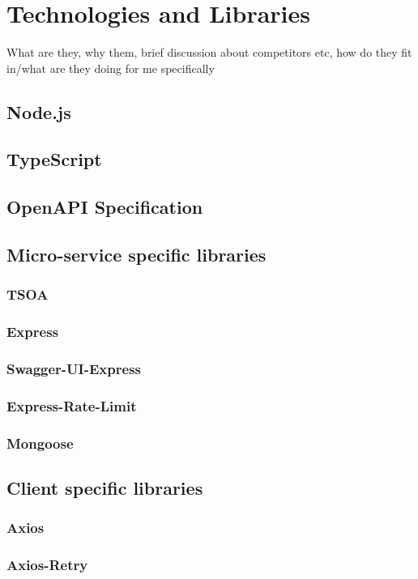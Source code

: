 \section{Technologies and Libraries}

What are they, why them, brief discussion about competitors etc, how do they fit in/what are they doing for me specifically
\subsection{Node.js}
\subsection{TypeScript}
\subsection{OpenAPI Specification}

\subsection{Micro-service specific libraries}
\subsubsection{TSOA}
\subsubsection{Express}
\subsubsection{Swagger-UI-Express}
\subsubsection{Express-Rate-Limit}
\subsubsection{Mongoose}

\subsection{Client specific libraries}
\subsubsection{Axios}
\subsubsection{Axios-Retry}

